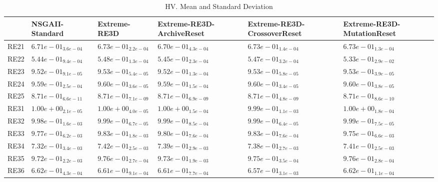 \documentclass{article}
\begin{document}
\begin{table}
\caption{HV. Mean and Standard Deviation}
\label{table: HV}
\centering
\begin{scriptsize}
\begin{tabular}{llllll}
\hline & NSGAII-Standard & Extreme-RE3D & Extreme-RE3D-ArchiveReset & Extreme-RE3D-CrossoverReset &  Extreme-RE3D-MutationReset\\
\hline 
RE21 & $  6.71e-01_{ 3.6e-04}$ & $  6.73e-01_{ 2.2e-04}$ & $  6.70e-01_{ 4.3e-04}$ & \cellcolor{gray25}$  6.73e-01_{ 1.4e-04}$ & \cellcolor{gray95}$  6.73e-01_{ 1.3e-04}$ \\
RE22 & $  5.44e-01_{ 9.4e-04}$ & \cellcolor{gray95}$  5.48e-01_{ 1.3e-04}$ & $  5.45e-01_{ 2.3e-04}$ & \cellcolor{gray25}$  5.47e-01_{ 3.2e-04}$ & $  5.33e-01_{ 2.9e-02}$ \\
RE23 & $  9.52e-01_{ 9.1e-05}$ & \cellcolor{gray25}$  9.53e-01_{ 5.4e-05}$ & $  9.52e-01_{ 1.3e-04}$ & \cellcolor{gray95}$  9.53e-01_{ 5.8e-05}$ & $  9.53e-01_{ 3.9e-05}$ \\
RE24 & $  9.59e-01_{ 2.5e-04}$ & \cellcolor{gray95}$  9.60e-01_{ 3.6e-05}$ & $  9.59e-01_{ 1.5e-04}$ & $  9.60e-01_{ 3.4e-05}$ & \cellcolor{gray25}$  9.60e-01_{ 3.8e-05}$ \\
RE25 & \cellcolor{gray95}$  8.71e-01_{ 6.6e-11}$ & $  8.71e-01_{ 7.1e-09}$ & $  8.71e-01_{ 6.9e-09}$ & $  8.71e-01_{ 4.8e-09}$ & \cellcolor{gray25}$  8.71e-01_{ 8.6e-10}$ \\
RE31 & \cellcolor{gray95}$  1.00e+00_{ 2.1e-05}$ & \cellcolor{gray25}$  1.00e+00_{ 4.0e-05}$ & $  1.00e+00_{ 1.5e-04}$ & $  9.99e-01_{ 1.1e-03}$ & $  1.00e+00_{ 1.8e-04}$ \\
RE32 & $  9.98e-01_{ 1.6e-03}$ & \cellcolor{gray25}$  9.99e-01_{ 6.7e-05}$ & $  9.99e-01_{ 8.5e-04}$ & $  9.99e-01_{ 6.4e-05}$ & \cellcolor{gray95}$  9.99e-01_{ 7.5e-05}$ \\
RE33 & $  9.77e-01_{ 6.2e-03}$ & \cellcolor{gray25}$  9.83e-01_{ 1.8e-03}$ & $  9.80e-01_{ 7.6e-04}$ & \cellcolor{gray95}$  9.83e-01_{ 7.6e-04}$ & $  9.75e-01_{ 6.6e-03}$ \\
RE34 & $  7.32e-01_{ 3.4e-03}$ & \cellcolor{gray95}$  7.42e-01_{ 2.5e-03}$ & $  7.39e-01_{ 2.9e-03}$ & $  7.38e-01_{ 2.7e-03}$ & \cellcolor{gray25}$  7.41e-01_{ 2.5e-03}$ \\
RE35 & $  9.72e-01_{ 2.2e-03}$ & \cellcolor{gray25}$  9.76e-01_{ 2.7e-04}$ & $  9.73e-01_{ 1.9e-03}$ & $  9.75e-01_{ 3.5e-04}$ & \cellcolor{gray95}$  9.76e-01_{ 2.8e-04}$ \\
RE36 & \cellcolor{gray25}$  6.62e-01_{ 4.3e-04}$ & $  6.61e-01_{ 9.1e-04}$ & $  6.61e-01_{ 7.7e-04}$ & $  6.57e-01_{ 3.1e-03}$ & \cellcolor{gray95}$  6.62e-01_{ 1.1e-04}$ \\

\end{tabular}
\end{scriptsize}
\end{table}
\end{document}
